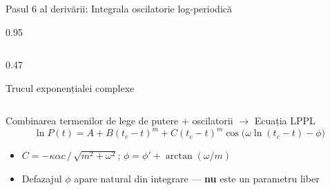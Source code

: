 \documentclass[9pt, aspectratio=169, t]{beamer}
\begin{document}
\begin{frame}{Pasul 6 al derivării: Integrala oscilatorie log-periodică}
\begin{cminipage}{0.95\textwidth}
{\begin{columns}[T]
\begin{column}{0.47\textwidth}
\begin{alertblock}{Trucul exponențialei complexe}
            \end{alertblock}
        \end{column}
    \end{columns}
    \vspace{-1mm}
    \begin{exampleblock}{Combinarea termenilor de lege de putere + oscilatorii $\longrightarrow$ Ecuația LPPL}
        \vspace{-1mm}
        $$\ln P(t) = A + B(t_c{-}t)^m + C(t_c{-}t)^m\cos\bigl(\omega\ln(t_c{-}t) - \phi\bigr)$$
        \vspace{-3mm}
        \begin{itemize}\setlength{\itemsep}{0pt}
            \item $C = -\kappa\alpha c\,/\,\sqrt{m^2 + \omega^2}$; \quad $\phi = \phi' + \arctan(\omega/m)$
            \item Defazajul $\phi$ apare natural din integrare --- \textbf{nu} este un parametru liber
        \end{itemize}
    \end{exampleblock}
    }
    \end{cminipage}
\end{frame}
\end{document}
